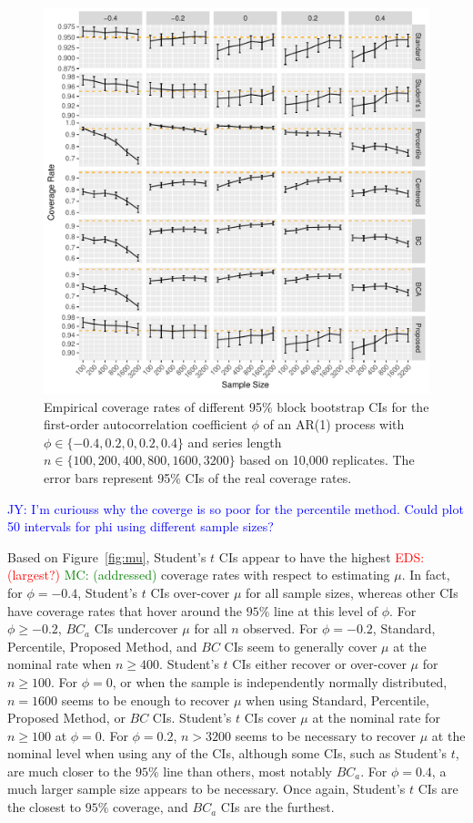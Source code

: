 \documentclass[12pt, letterpaper, titlepage]{article}
\newcommand{\jy}[1]{\textcolor{blue}{JY: #1}}
\newcommand{\eds}[1]{\textcolor{red}{EDS: (#1)}}
\newcommand{\mc}[1]{\textcolor{green}{MC: (#1)}}
\begin{document}
\begin{figure}[tbp]
  \centering
  \includegraphics[width=\textwidth]{figures/plot_phi}
  \caption{Empirical coverage rates of different 95\% block bootstrap CIs for
    the first-order autocorrelation coefficient $\phi$ of an AR(1) process with
    $\phi \in \{-0.4, 0.2, 0, 0.2, 0.4\}$ and series length
    $n \in \{100, 200, 400, 800, 1600, 3200\}$ based on 10,000 replicates.
    The error bars represent 95\% CIs of the real coverage rates.}
  \label{fig:phi}
\end{figure}

\jy{I'm curiouss why the coverge is so poor for the percentile method. Could
  plot 50 intervals for phi using different sample sizes?}

Based on Figure~\ref{fig:mu}, 
Student's $t$ CIs appear to have the highest \eds{largest?} \mc{addressed} coverage rates with 
respect 
to estimating $\mu$. In fact, for $\phi = -0.4$, Student's $t$ CIs over-cover 
$\mu$ for all sample sizes, whereas other CIs have coverage rates that
hover around the $95\%$ line at this level of $\phi$. For $\phi \geq -0.2$,
$BC_a$ CIs undercover $\mu$ for all $n$ observed. For $\phi = -0.2$, 
Standard, Percentile, %
Proposed Method, and $BC$ CIs seem to 
generally cover $\mu$ at the nominal 
rate when $n \geq 400$. Student's $t$ CIs either recover or over-cover $\mu$
for $n \geq 100$. For $\phi = 0$, or when the 
sample is independently normally distributed, $n = 1600$ seems to 
be enough to recover $\mu$ when using Standard, Percentile, 
Proposed Method, or $BC$ 
CIs. Student's $t$ CIs cover $\mu$ at the nominal rate for $n \geq 100$ at 
$\phi = 0$.
For $\phi = 0.2$, $n > 3200$ seems to be necessary to recover $\mu$
at the nominal level when using
any of the CIs, although some CIs, such as Student's $t$, are much closer to the
$95\%$ line than others, most notably $BC_a$.
For $\phi = 0.4$, a much larger sample size appears to be necessary. Once again,
Student's $t$ CIs are the closest to $95\%$ coverage, and $BC_a$ CIs are the 
furthest.
\end{document}
